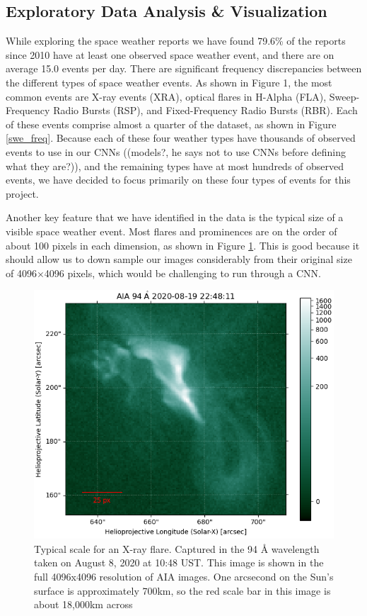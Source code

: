 \documentclass[12pt, letterpaper]{article}
\begin{document}
\subsection*{Exploratory Data Analysis \& Visualization}

While exploring the space weather reports we have found 79.6\% of the reports since 2010 have at least one observed space weather event, and there are on average 15.0 events per day. There are significant frequency discrepancies between the different types of space weather events. As shown in Figure 1, the most common events are X-ray events (XRA), optical flares in H-Alpha (FLA), Sweep-Frequency Radio Bursts (RSP), and Fixed-Frequency Radio Bursts (RBR). Each of these events comprise almost a quarter of the dataset, as shown in Figure \ref{swe_freq}. Because each of these four weather types have thousands of observed events to use in our CNNs ((models?, he says not to use CNNs before defining what they are?)), and the remaining types have at most hundreds of observed events, we have decided to focus primarily on these four types of events for this project. 

Another key feature that we have identified in the data is the typical size of a visible space weather event. Most flares and prominences are on the order of about 100 pixels in each dimension, as shown in Figure \ref{event_size}. This is good because it should allow us to down sample our images considerably from their original size of 4096$\times$4096 pixels, which would be challenging to run through a CNN. 

\begin{figure}[h]
	\centering
	\includegraphics[]{figures/feature_scale.png}
	\caption{Typical scale for an X-ray flare. Captured in the 94 Å wavelength taken on August 8, 2020 at 10:48 UST. This image is shown in the full 4096x4096 resolution of AIA images. One arcsecond on the Sun's surface is approximately 700km, so the red scale bar in this image is about 18,000km across}
	\label{event_size}
\end{figure}
\end{document}
